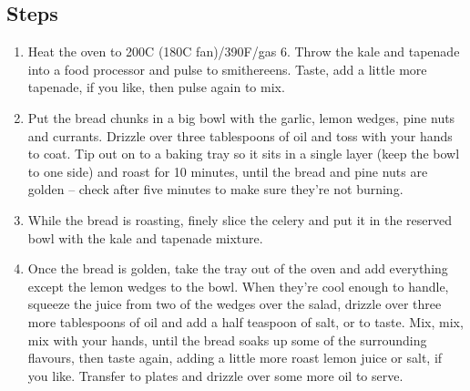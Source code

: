 \documentclass{book}
\begin{document}
\subsection*{Steps}
\begin{enumerate}
\item Heat the oven to 200C (180C fan)/390F/gas 6. Throw the kale and tapenade into a food processor and pulse to smithereens. Taste, add a little more tapenade, if you like, then pulse again to mix.
\item Put the bread chunks in a big bowl with the garlic, lemon wedges, pine nuts and currants. Drizzle over three tablespoons of oil and toss with your hands to coat. Tip out on to a baking tray so it sits in a single layer (keep the bowl to one side) and roast for 10 minutes, until the bread and pine nuts are golden – check after five minutes to make sure they’re not burning.
\item While the bread is roasting, finely slice the celery and put it in the reserved bowl with the kale and tapenade mixture.
\item Once the bread is golden, take the tray out of the oven and add everything except the lemon wedges to the bowl. When they’re cool enough to handle, squeeze the juice from two of the wedges over the salad, drizzle over three more tablespoons of oil and add a half teaspoon of salt, or to taste. Mix, mix, mix with your hands, until the bread soaks up some of the surrounding flavours, then taste again, adding a little more roast lemon juice or salt, if you like. Transfer to plates and drizzle over some more oil to serve.
\end{enumerate}
\newpage
\end{document}
